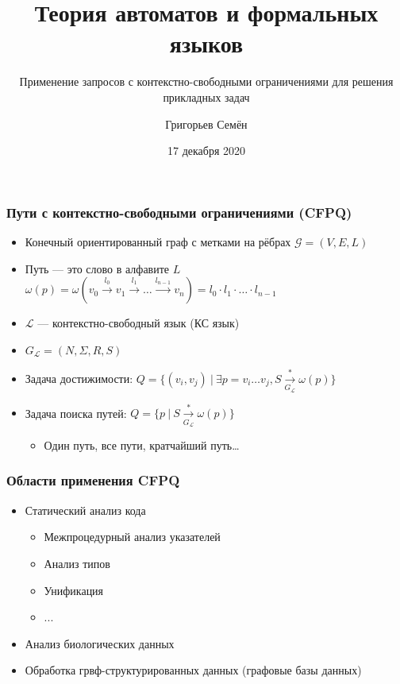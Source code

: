 \documentclass{beamer}
\title[]{Теория автоматов и формальных языков}
\subtitle[]{Применение запросов с контекстно-свободными ограничениями для решения прикладных задач}
\institute[]{
Санкт-Петербургский государственный университет\\
}
\author[]{Григорьев Семён}
\date{17 декабря 2020}
\begin{document}
{
  \begin{frame}
    \titlepage
  \end{frame}
}

\begin{frame}[fragile]
  \frametitle{Пути с контекстно-свободными ограничениями (CFPQ)}
   \begin{itemize}
      \item Конечный ориентированный граф с метками на рёбрах $\mathcal{G} = (V,E,L)$
      \item Путь --- это слово в алфавите $L$ $\omega(p) = \omega(v_0 \xrightarrow{l_0} v_1 \xrightarrow{l_1} \dots \xrightarrow{l_{n-1}} v_n ) = l_0 \cdot l_1 \cdot \ldots \cdot l_{n-1}$
      \item $\mathcal{L}$ --- контекстно-свободный язык (КС язык)
      \item $G_{\mathcal{L}} = (N,\Sigma,R,S)$
    \end{itemize}
    \pause
    \begin{itemize}
      \item Задача достижимости: $Q=\{(v_i,v_j) \ | \ \exists p = v_i \dots v_j, S \xrightarrow[G_{\mathcal{L}}]{*} \omega(p) \}$
      \item Задача поиска путей: $Q=\{p \ | \ S \xrightarrow[G_{\mathcal{L}}]{*} \omega(p)\}$
      \begin{itemize}
        \item Один путь, все пути, кратчайший путь\dots
      \end{itemize}
    \end{itemize}

\end{frame}


\begin{frame}[fragile]
  \frametitle{Области применения CFPQ}
    \begin{itemize}
      \item Статический анализ кода
      \begin{itemize}
        \item Межпроцедурный анализ указателей
        \item Анализ типов
        \item Унификация
        \item ...
      \end{itemize}
      \item Анализ биологических данных
      \item Обработка грвф-структурированных данных (графовые базы данных)
  \end{itemize}
\end{frame}
\end{document}
